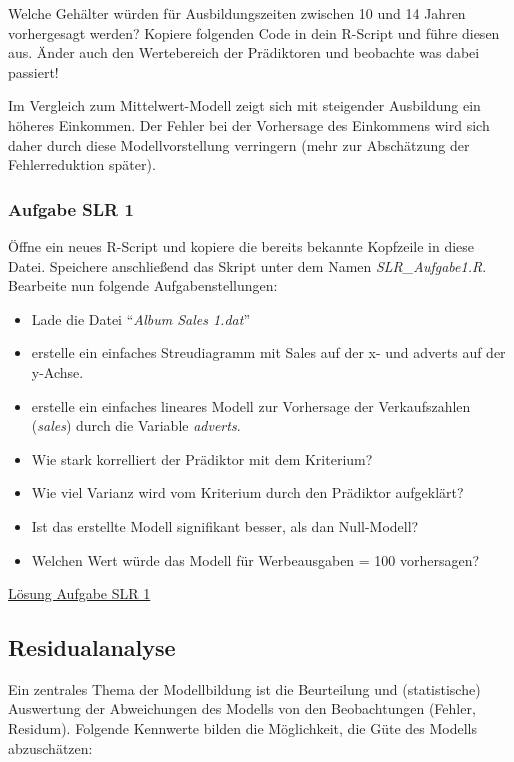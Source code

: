 \documentclass[]{article}
\providecommand{\tightlist}{%
  \setlength{\itemsep}{0pt}\setlength{\parskip}{0pt}}
\begin{document}
Welche Gehälter würden für Ausbildungszeiten zwischen 10 und 14 Jahren
vorhergesagt werden? Kopiere folgenden Code in dein R-Script und führe
diesen aus. Änder auch den Wertebereich der Prädiktoren und beobachte
was dabei passiert!

Im Vergleich zum Mittelwert-Modell zeigt sich mit steigender Ausbildung
ein höheres Einkommen. Der Fehler bei der Vorhersage des Einkommens wird
sich daher durch diese Modellvorstellung verringern (mehr zur
Abschätzung der Fehlerreduktion später).

\hypertarget{aufgabe-slr-1}{\subsubsection*{Aufgabe SLR
1}\label{aufgabe-slr-1}}

Öffne ein neues R-Script und kopiere die bereits bekannte Kopfzeile in
diese Datei. Speichere anschließend das Skript unter dem Namen
\emph{SLR\_Aufgabe1.R}. Bearbeite nun folgende Aufgabenstellungen:

\begin{itemize}
\tightlist
\item
  Lade die Datei ``\emph{Album Sales 1.dat}''
\item
  erstelle ein einfaches Streudiagramm mit Sales auf der x- und adverts
  auf der y-Achse.
\item
  erstelle ein einfaches lineares Modell zur Vorhersage der
  Verkaufszahlen (\emph{sales}) durch die Variable \emph{adverts}.
\item
  Wie stark korrelliert der Prädiktor mit dem Kriterium?
\item
  Wie viel Varianz wird vom Kriterium durch den Prädiktor aufgeklärt?
\item
  Ist das erstellte Modell signifikant besser, als dan Null-Modell?
\item
  Welchen Wert würde das Modell für Werbeausgaben = 100 vorhersagen?
\end{itemize}

\protect\hyperlink{aufgabe-slr-1-lsg}{Lösung Aufgabe SLR 1}

\subsection*{Residualanalyse}\label{residualanalyse}

Ein zentrales Thema der Modellbildung ist die Beurteilung und
(statistische) Auswertung der Abweichungen des Modells von den
Beobachtungen (Fehler, Residum). Folgende Kennwerte bilden die
Möglichkeit, die Güte des Modells abzuschätzen:
\end{document}
